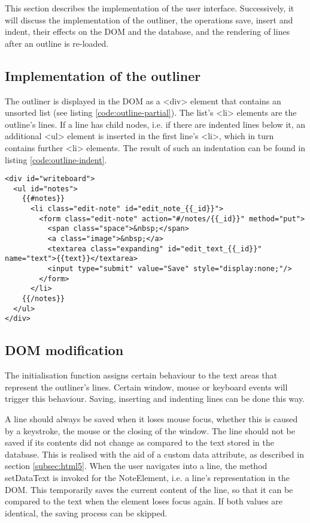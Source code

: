 This section describes the implementation of the user interface. Successively, it will discuss the implementation of the outliner, the operations save, insert and indent, their effects on the DOM and the database, and the rendering of lines after an outline is re-loaded.


\subsection{Implementation of the outliner}

The outliner is displayed in the DOM as a {\selectfont <div>} element that contains an unsorted list (see listing \ref{code:outline-partial}). The list's {\selectfont <li>} elements are the outline's lines. If a line has child nodes, i.e. if there are indented lines below it, an additional {\selectfont <ul>} element is inserted in the first line's {\selectfont <li>}, which in turn contains further {\selectfont <li>} elements. The result of such an indentation can be found in listing \ref{code:outline-indent}.

\lstset{language=html}
\medskip 
\begin{lstlisting}[label=code:outline-partial, caption=Template for the outliner in Mustache syntax]
<div id="writeboard">
  <ul id="notes">
    {{#notes}}
      <li class="edit-note" id="edit_note_{{_id}}">
        <form class="edit-note" action="#/notes/{{_id}}" method="put">
          <span class="space">&nbsp;</span>
          <a class="image">&nbsp;</a>
          <textarea class="expanding" id="edit_text_{{_id}}" name="text">{{text}}</textarea>
          <input type="submit" value="Save" style="display:none;"/>
        </form>
      </li>
    {{/notes}}
  </ul>
</div>
\end{lstlisting}


\subsection{DOM modification}

The initialisation function assigns certain behaviour to the text areas that represent the outliner's lines. Certain window, mouse or keyboard events will trigger this behaviour. Saving, inserting and indenting lines can be done this way.

A line should always be saved when it loses mouse focus, whether this is caused by a keystroke, the mouse or the closing of the window. The line should not be saved if its contents did not change as compared to the text stored in the database. This is realised with the aid of a custom data attribute, as described in section \ref{subsec:html5}. When the user navigates into a line, the method {\selectfont setDataText} is invoked for the {\selectfont NoteElement}, i.e. a line's representation in the DOM. This temporarily saves the current content of the line, so that it can be compared to the text when the element loses focus again. If both values are identical, the saving process can be skipped.


